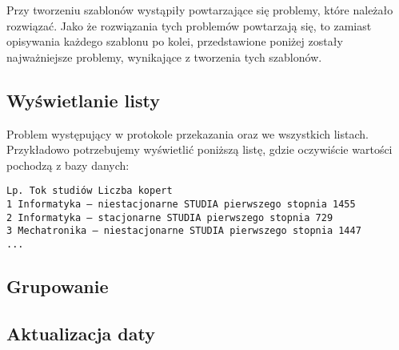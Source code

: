 Przy tworzeniu szablonów wystąpiły powtarzające się problemy, które należało rozwiązać.  Jako że rozwiązania tych problemów powtarzają się, to zamiast opisywania każdego szablonu po kolei, przedstawione poniżej zostały najważniejsze problemy, wynikające z tworzenia tych szablonów.

\subsection{Wyświetlanie listy}
Problem występujący w protokole przekazania oraz we wszystkich listach. Przykładowo potrzebujemy wyświetlić poniższą listę, gdzie oczywiście wartości pochodzą z bazy danych:
\begin{lstlisting}
Lp. Tok studiów Liczba kopert
1 Informatyka — niestacjonarne STUDIA pierwszego stopnia 1455
2 Informatyka — stacjonarne STUDIA pierwszego stopnia 729
3 Mechatronika — niestacjonarne STUDIA pierwszego stopnia 1447
...
\end{lstlisting}

\subsection{Grupowanie}
\subsection{Aktualizacja daty}